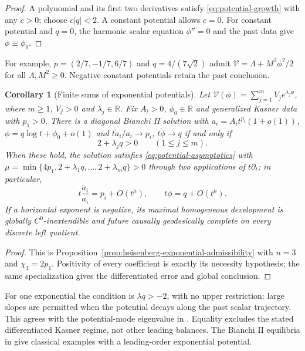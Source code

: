 \documentclass[10pt,a4paper]{article}
\numberwithin{equation}{section}
\newtheorem{corollary}[theorem]{Corollary}
\theoremstyle{definition}
\theoremstyle{remark}
\newcommand{\R}{\mathbb R}
\begin{document}
\begin{proof}
A polynomial and its first two derivatives satisfy
\eqref{eq:potential-growth} with any $c>0$; choose $c|q|<2$.
A constant potential allows $c=0$.  For constant potential and
$q=0$, the harmonic scalar equation $\phi''=0$ and the past
data give $\phi\equiv\phi_0$.
\end{proof}

For example, $p=(2/7,-1/7,6/7)$ and $q=4/(7\sqrt2)$ admit
$\mathcal V=\Lambda+M^2\phi^2/2$ for all $\Lambda,M^2\ge0$.
Negative constant potentials retain the past conclusion.

\begin{corollary}[Finite sums of exponential potentials]
\label{cor:exponential-potential-sector}
Let $\mathcal V(\phi)=\sum_{j=1}^{m}V_j e^{\lambda_j\phi}$,
where $m\ge1$, $V_j>0$ and $\lambda_j\in\R$.  Fix $A_i>0$,
$\phi_0\in\R$ and generalized Kasner data with $p_1>0$.
There is a diagonal Bianchi II solution with
$a_i=A_it^{p_i}(1+o(1))$, $\phi=q\log t+\phi_0+o(1)$ and
$t\dot a_i/a_i\to p_i$, $t\dot\phi\to q$ if and only if
\begin{equation}
 2+\lambda_jq>0\qquad(1\le j\le m).
 \label{eq:one-sided-potential-condition}
\end{equation}
When these hold, the solution satisfies
\eqref{eq:potential-asymptotics} with
$\mu=\min\{4p_1,2+\lambda_1q,\ldots,2+\lambda_mq\}>0$
through two applications of $t\partial_t$; in particular,
\begin{equation}
 t\frac{\dot a_i}{a_i}=p_i+O(t^\mu),\qquad
 t\dot\phi=q+O(t^\mu).
 \label{eq:exponential-differentiated-asymptotics}
\end{equation}
If a horizontal exponent is negative, its maximal homogeneous
development is globally $C^0$-inextendible and future causally
geodesically complete on every discrete left quotient.
\end{corollary}

\begin{proof}
This is Proposition~\ref{prop:heisenberg-exponential-admissibility}
with $n=3$ and $\chi_1=2p_1$.  Positivity of every coefficient
is exactly its necessity hypothesis; the same specialization
gives the differentiated error and global conclusion.
\end{proof}

For one exponential the condition is $\lambda q>-2$, with no
upper restriction: large slopes are permitted when the potential
decays along the past scalar trajectory.  This agrees with the
potential-mode eigenvalue in \cite[equation~(3.12)]{BillyardEtAl1999}.
Equality excludes the stated differentiated Kasner regime, not
other leading balances.  The Bianchi II equilibria in
\cite[Section~III.A, item~3]{BillyardEtAl1999} give classical
examples with a leading-order exponential potential.
\end{document}
